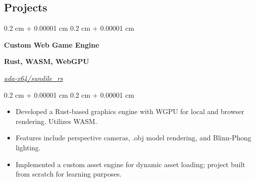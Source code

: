 \documentclass[10pt, letterpaper]{article}
\newenvironment{highlights}{ \begin{itemize}[ topsep=0.10 cm, parsep=0.10 cm, partopsep=0pt,
itemsep=0pt, leftmargin=0.4 cm + 10pt ] }{ \end{itemize} } %
\newenvironment{onecolentry}{ \begin{adjustwidth}{ 0.2 cm + 0.00001 cm }{ 0.2 cm + 0.00001 cm }
}{ \end{adjustwidth}} %
\newenvironment{twocolentry}[2][]{ \onecolentry \def\secondColumn{#2} \setcolumnwidth{\fill, 10 cm}
\begin{paracol}{2} }{ \switchcolumn \raggedleft \secondColumn \end{paracol}
\endonecolentry } %
\let\hrefWithoutArrow\href
\renewcommand{\href}[2]{\hrefWithoutArrow{#1}{\ifthenelse{\equal{#2}{}}{ }{#2 }\raisebox{.15ex}{\footnotesize \faExternalLink*}}}
\begin{document}


	\begin{samepage}
		\section{Projects}

		\newenvironment{project}[4]{
		\begin{twocolentry}
			{%
			\textbf{#2}

			\textit{#3}%
			}%
			\textbf{#1}

			\textit{#4}
		\end{twocolentry}
		\vspace{0.10 cm}
		\begin{onecolentry} \begin{highlights} }{ \end{highlights} \end{onecolentry}

		\vspace{0.2 cm}
		}

		\begin{project}
			{Custom Web Game Engine}%
			{Rust, WASM, WebGPU}%
			{\hrefWithoutArrow{https://github.com/ada-x64/sundile_rs}{ada-x64/sundile\_rs \faGithub}}
			{}%
			\item Developed a Rust-based graphics engine with WGPU for local and
			browser rendering. Utilizes WASM.

			\item Features include perspective cameras, .obj model rendering, and
			Blinn-Phong lighting.

			\item Implemented a custom asset engine for dynamic asset loading; project
			built from scratch for learning purposes.
		\end{project}
	\end{samepage}
\end{document}
